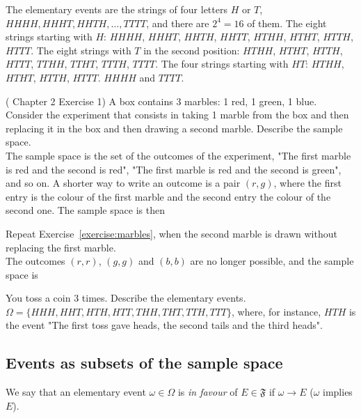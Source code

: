 \begin{ExerciseList}
	\Answer The elementary events are the strings of four letters $H$ or $T$, $HHHH, HHHT, HHTH, \ldots, TTTT$, and there are $2^4 = 16$ of them. 
	\Question The eight strings starting with $H$: $HHHH$, $HHHT$, $HHTH$, $HHTT$, $HTHH$, $HTHT$, $HTTH$, $HTTT$. 
	\Question The eight strings with $T$ in the second position: $HTHH$, $HTHT$, $HTTH$, $HTTT$, $TTHH$, $TTHT$, $TTTH$, $TTTT$. 
	\Question The four strings starting with $HT$: $HTHH$, $HTHT$, $HTTH$, $HTTT$. 
	\Question $HHHH$ and $TTTT$.	
	

\Exercise (\cite{Ross} Chapter 2 Exercise 1)
	\label{exercise:marbles}
  A box contains 3 marbles: 1 red, 1 green, 1 blue. Consider the experiment that consists in taking 1 marble from the box and then replacing it in the box and then drawing a second marble. Describe the sample space.\\
 	
	\Answer The sample space is the set of the outcomes of the experiment, "The first marble is red and the second is red", "The first marble is red and the second is green", and so on. A shorter way to write an outcome is a pair $(r,g)$, where the first entry is the colour of the first marble and the second entry the colour of the second one. The sample space is then 
 	
	\Exercise
 Repeat Exercise~\ref{exercise:marbles}, when the second marble is drawn without replacing the first marble.\\

     	\Answer The outcomes $(r,r)$, $(g,g)$ and $(b,b)$ are no longer possible, and the sample space is 
	
	\Exercise
You toss a coin 3 times. Describe the elementary events.\\
	
	\Answer $\Omega = \{HHH, HHT, HTH, HTT, THH, THT, TTH, TTT\}$, where, for instance, $HTH$ is the event "The first toss gave heads, the second tails and the third heads".
\end{ExerciseList}




\subsection{Events as subsets of the sample space}
\label{ss:subset}

\begin{definition}
	\label{d:favour}
	We say that an elementary event $\omega \in \Omega$ is \emph{in favour} of $E \in \mathfrak F$ if $\omega \rightarrow E$ ($\omega$ implies $E$). 
\end{definition}

